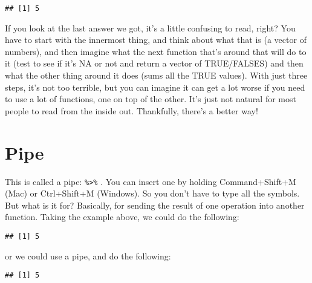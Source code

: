\documentclass[
]{article}
\newenvironment{Shaded}{\begin{snugshade}}{\end{snugshade}}
\newcommand{\FunctionTok}[1]{\textcolor[rgb]{0.13,0.29,0.53}{\textbf{#1}}}
\newcommand{\NormalTok}[1]{#1}
\newcommand{\SpecialCharTok}[1]{\textcolor[rgb]{0.81,0.36,0.00}{\textbf{#1}}}
\begin{document}
\begin{verbatim}
## [1] 5
\end{verbatim}

If you look at the last answer we got, it's a little confusing to read,
right? You have to start with the innermost thing, and think about what
that is (a vector of numbers), and then imagine what the next function
that's around that will do to it (test to see if it's NA or not and
return a vector of TRUE/FALSES) and then what the other thing around it
does (sums all the TRUE values). With just three steps, it's not too
terrible, but you can imagine it can get a lot worse if you need to use
a lot of functions, one on top of the other. It's just not natural for
most people to read from the inside out. Thankfully, there's a better
way!

\hypertarget{pipe}{%
\section{Pipe}\label{pipe}}

This is called a pipe: \texttt{\%\textgreater{}\%} . You can insert one
by holding Command+Shift+M (Mac) or Ctrl+Shift+M (Windows). So you don't
have to type all the symbols. But what is it for? Basically, for sending
the result of one operation into another function. Taking the example
above, we could do the following:

\begin{Shaded}
\end{Shaded}

\begin{verbatim}
## [1] 5
\end{verbatim}

or we could use a pipe, and do the following:

\begin{Shaded}
\end{Shaded}

\begin{verbatim}
## [1] 5
\end{verbatim}
\end{document}
